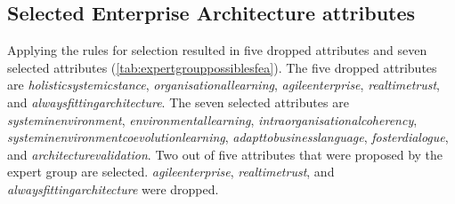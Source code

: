 \subsection{Selected Enterprise Architecture attributes}
\label{sub:validationselectedeaattributes}
Applying the rules for selection resulted in five dropped \glspl{attribute} and seven selected \glspl{attribute} (\cref{tab:expertgrouppossiblesfea}). The five dropped \glspl{attribute} are \textit{\gls{holisticsystemicstance}}, \textit{\gls{organisationallearning}}, \textit{\gls{agileenterprise}}, \textit{\gls{realtimetrust}}, and \textit{\gls{alwaysfittingarchitecture}}. The seven selected attributes are \textit{\gls{systeminenvironment}}, \textit{\gls{environmentallearning}}, \textit{\gls{intraorganisationalcoherency}}, \textit{\gls{systeminenvironmentcoevolutionlearning}}, \textit{\gls{adapttobusinesslanguage}}, \textit{\gls{fosterdialogue}}, and \textit{\gls{architecturevalidation}}. Two out of five attributes that were proposed by the expert group are selected. \textit{\Gls{agileenterprise}}, \textit{\gls{realtimetrust}}, and \textit{\gls{alwaysfittingarchitecture}} were dropped.
\begin{table}[H]
	\centering
	\caption[Identified Enterprise Architecture attributes by the expert group]{Identified Enterprise Architecture attributes by the expert group}
	\label{tab:expertgrouppossiblesfea}%
\end{table}%

